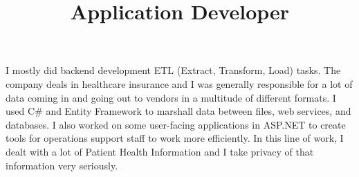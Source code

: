 \title{\textbf{Application Developer}}
\begin{position}
I mostly did backend development ETL (Extract, Transform, Load) tasks. The
company deals in healthcare insurance and I was generally responsible for a
lot of data coming in and going out to vendors in a multitude of different
formats. I used C\# and Entity Framework to marshall data between files, web
services, and databases. I also worked on some user-facing applications in
ASP.NET to create tools for operations support staff to work more efficiently.
In this line of work, I dealt with a lot of Patient Health Information
and I take privacy of that information very seriously.
\end{position}

